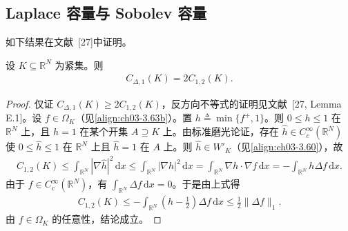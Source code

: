 \documentclass[../../main.tex]{subfiles}%
\begin{document}
\subsection{Laplace 容量与 Sobolev 容量}\label{subsection:ch03-Laplacian}

如下结果在文献~[27]中证明。

\begin{proposition}\label{proposition:ch03-Laplacian=Sobolev}
设 $K\subseteq\mathbb{R}^N$ 为紧集。则
\begin{align}
C_{\Delta,1}(K)=2C_{1,2}(K).\label{align:ch03-3.77}
\end{align}
\end{proposition}

\begin{proof}
仅证 $C_{\Delta,1}(K)\geqslant2C_{1,2}(K)$，反方向不等式的证明见文献~[27, Lemma E.1]。设 $f\in\Omega_K$（见\eqref{align:ch03-3.63b}）。置 $h\triangleq\min\{f^+,1\}$。则 $0\leqslant h\leqslant1$ 在 $\mathbb{R}^N$ 上，且 $h=1$ 在某个开集 $A\supseteq K$ 上。由标准磨光论证，存在 $\widehat h\in C^\infty_c(\mathbb{R}^N)$ 使 $0\leqslant\widehat h\leqslant1$ 在 $\mathbb{R}^N$ 上且 $\widehat h=1$ 在 $A$ 上。则 $\widehat h\in W'_K$（见\eqref{align:ch03-3.60}），故
\begin{align*}
C_{1,2}(K)\leqslant\int_{\mathbb{R}^N}|\nabla\widehat h|^2\,\mathrm{d}x\leqslant\int_{\mathbb{R}^N}|\nabla h|^2\,\mathrm{d}x
=\int_{\mathbb{R}^N}\nabla h\cdot\nabla f\,\mathrm{d}x=-\int_{\mathbb{R}^N}h\Delta f\,\mathrm{d}x.
\end{align*}
由于 $f\in C^\infty_c(\mathbb{R}^N)$，有 $\int_{\mathbb{R}^N}\Delta f\,\mathrm{d}x=0$。于是由上式得
\begin{align*}
C_{1,2}(K)\leqslant-\int_{\mathbb{R}^N}\left(h-\frac12\right)\Delta f\,\mathrm{d}x\leqslant\frac12\|\Delta f\|_1.
\end{align*}
由 $f\in\Omega_K$ 的任意性，结论成立。
\end{proof}
\end{document}
